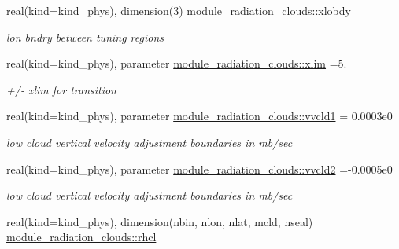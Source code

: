 \begin{DoxyCompactItemize}
\mbox{\label{group__module__radiation__clouds_gaab28f783919380e5ff7f925f70355a57}} 
real(kind=kind\+\_\+phys), dimension(3) \hyperlink{group__module__radiation__clouds_gaab28f783919380e5ff7f925f70355a57}{module\+\_\+radiation\+\_\+clouds\+::xlobdy}
\begin{DoxyCompactList}\small\item\em lon bndry between tuning regions \end{DoxyCompactList}\item 
\mbox{\label{group__module__radiation__clouds_ga1146f43b680b655d354a9c031ee4a463}} 
real(kind=kind\+\_\+phys), parameter \hyperlink{group__module__radiation__clouds_ga1146f43b680b655d354a9c031ee4a463}{module\+\_\+radiation\+\_\+clouds\+::xlim} =5.
\begin{DoxyCompactList}\small\item\em +/-\/ xlim for transition \end{DoxyCompactList}\item 
\mbox{\label{group__module__radiation__clouds_ga6ec3c0444de53580befd4bb4d39844d3}} 
real(kind=kind\+\_\+phys), parameter \hyperlink{group__module__radiation__clouds_ga6ec3c0444de53580befd4bb4d39844d3}{module\+\_\+radiation\+\_\+clouds\+::vvcld1} = 0.\+0003e0
\begin{DoxyCompactList}\small\item\em low cloud vertical velocity adjustment boundaries in mb/sec \end{DoxyCompactList}\item 
\mbox{\label{group__module__radiation__clouds_ga67962e77fb073cc25cafaaba0c2fa833}} 
real(kind=kind\+\_\+phys), parameter \hyperlink{group__module__radiation__clouds_ga67962e77fb073cc25cafaaba0c2fa833}{module\+\_\+radiation\+\_\+clouds\+::vvcld2} =-\/0.\+0005e0
\begin{DoxyCompactList}\small\item\em low cloud vertical velocity adjustment boundaries in mb/sec \end{DoxyCompactList}\item 
\mbox{\label{group__module__radiation__clouds_ga9673faf82ef00e0501763664743e3720}} 
real(kind=kind\+\_\+phys), dimension(nbin, nlon, nlat, mcld, nseal) \hyperlink{group__module__radiation__clouds_ga9673faf82ef00e0501763664743e3720}{module\+\_\+radiation\+\_\+clouds\+::rhcl}

\end{DoxyCompactItemize}
